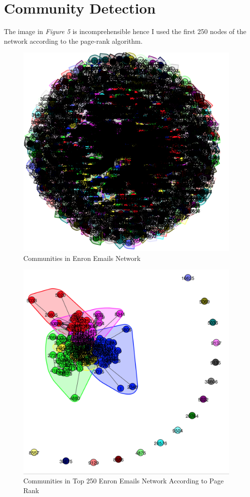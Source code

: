 \documentclass[11pt, oneside]{article}   	%
\begin{document}
\section{Community Detection}
The image in \emph{Figure 5} is  incomprehensible hence I used the first 250 nodes of the network according to the page-rank algorithm.
\begin{figure}
  \centering
  \includegraphics[width=\columnwidth]{communities.png}
  \caption{ Communities in Enron Emails Network}
\end{figure}

\begin{figure}
  \centering
  \includegraphics[width=\columnwidth]{communities-page-rank.png}
  \caption{ Communities in Top 250 Enron Emails Network According to Page Rank}
\end{figure}
\end{document}
